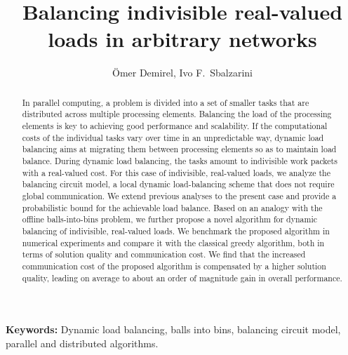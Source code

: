 \documentclass[12pt,psfig,a4]{article}
\theoremstyle{plain}
\begin{document}
 
\pagestyle{plain} 


\title{Balancing indivisible real-valued loads in arbitrary networks}
\author{ \"Omer Demirel, Ivo F.~Sbalzarini  \\
  }
\maketitle



\begin{abstract} 
In parallel computing, a problem is divided into a set of smaller tasks that are distributed across multiple processing elements. Balancing the load of the processing elements is key to achieving good performance and scalability. If the computational costs of the individual tasks vary over time in an unpredictable way, dynamic load balancing aims at migrating them between processing elements so as to maintain load balance. During dynamic load balancing, the tasks amount to indivisible work packets with a real-valued cost. For this case of indivisible, real-valued loads, we analyze the balancing circuit model, a local dynamic load-balancing scheme that does not require global communication. We extend previous analyses to the present case and provide a probabilistic bound for the achievable load balance. Based on an analogy with the offline balls-into-bins problem, we further propose a novel algorithm for dynamic balancing of indivisible, real-valued loads. We benchmark the proposed algorithm in numerical experiments and compare it with the classical greedy algorithm, both in terms of solution quality and communication cost. We find that the increased communication cost of the proposed algorithm is compensated by a higher solution quality, leading on average to about an order of magnitude gain in overall performance.


\end{abstract} 

{\bf Keywords:} Dynamic load balancing, balls into bins, balancing circuit model, parallel and distributed algorithms. \\
\end{document}
